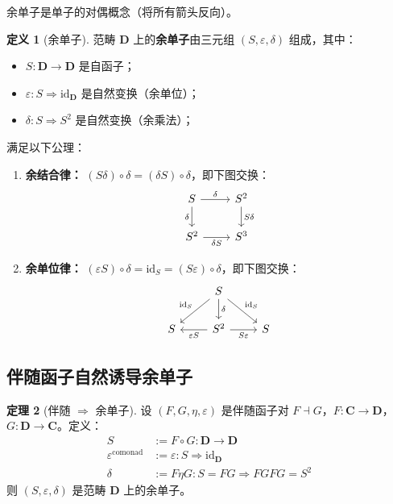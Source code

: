 \documentclass[12pt,a4paper]{ctexart}
\theoremstyle{definition}
\newtheorem{definition}{定义}[section]
\newtheorem{theorem}[definition]{定理}
\newcommand{\cat}[1]{\mathbf{#1}}
\newcommand{\id}{\mathrm{id}}
\newcommand{\dashvadj}{\dashv}
\begin{document}
余单子是单子的对偶概念（将所有箭头反向）。

\begin{definition}[余单子]
范畴 $\cat{D}$ 上的\textbf{余单子}由三元组 $(S, \varepsilon, \delta)$ 组成，其中：
\begin{itemize}[nosep]
    \item $S: \cat{D} \to \cat{D}$ 是自函子；
    \item $\varepsilon: S \Rightarrow \id_{\cat{D}}$ 是自然变换（余单位）；
    \item $\delta: S \Rightarrow S^2$ 是自然变换（余乘法）；
\end{itemize}
满足以下公理：
\begin{enumerate}[label=(CM\arabic*),nosep]
    \item \textbf{余结合律：} $(S \delta) \circ \delta = (\delta S) \circ \delta$，即下图交换：
    \[
    \begin{tikzcd}
    S \arrow[r,"\delta"] \arrow[d,"\delta"'] & S^2 \arrow[d,"S\delta"] \\
    S^2 \arrow[r,"\delta S"'] & S^3
    \end{tikzcd}
    \]
    \item \textbf{余单位律：} $(\varepsilon S) \circ \delta = \id_S = (S \varepsilon) \circ \delta$，即下图交换：
    \[
    \begin{tikzcd}
    & S \arrow[dl,"\id_S"'] \arrow[d,"\delta"] \arrow[dr,"\id_S"] & \\
    S & S^2 \arrow[l,"\varepsilon S"] \arrow[r,"S\varepsilon"'] & S
    \end{tikzcd}
    \]
\end{enumerate}
\end{definition}

\subsection{伴随函子自然诱导余单子}

\begin{theorem}[伴随 $\Rightarrow$ 余单子]\label{thm:adj-comonad}
设 $(F, G, \eta, \varepsilon)$ 是伴随函子对 $F \dashvadj G$，$F: \cat{C} \to \cat{D}$，$G: \cat{D} \to \cat{C}$。定义：
\begin{align}
S &:= F \circ G : \cat{D} \to \cat{D} \label{eq:S-def}\\
\varepsilon^{\mathrm{comonad}} &:= \varepsilon : S \Rightarrow \id_{\cat{D}} \label{eq:eps-comonad}\\
\delta &:= F \eta G : S = FG \Longrightarrow FGFG = S^2 \label{eq:delta-def}
\end{align}
则 $(S, \varepsilon, \delta)$ 是范畴 $\cat{D}$ 上的余单子。
\end{theorem}
\end{document}
